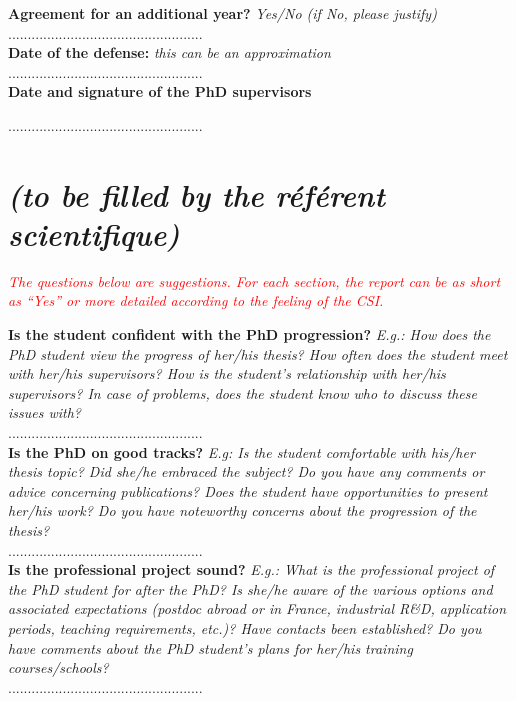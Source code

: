 \documentclass[12pt]{article}
\newcommand{\commentaire}[1]{\small\textit{#1}}
\begin{document}
\noindent\textbf{Agreement for an additional year?}
\commentaire{%
  Yes/No (if No, please justify)\\}
..................................................
\\

\noindent\textbf{Date of the defense:}
\commentaire{%
  this can be an approximation\\}
..................................................
\\


\noindent\textbf{Date and signature of the PhD supervisors}

..................................................

\newpage
\section*{ \textit{\small (to be filled by the ré\-fé\-rent scientifique)}}

\commentaire{%
  \textcolor{red}{The questions below are suggestions. For each
    section, the report can be as short as “Yes” or more detailed
    according to the feeling of the CSI.\\}}

\noindent\textbf{Is the student confident with the PhD progression?}
\commentaire{%
  E.g.: How does the PhD student view the progress of
  her/his thesis? How often does the student meet with her/his
  supervisors? How is the student’s relationship with her/his
  supervisors? In case of problems, does the student know who to
  discuss these issues with?\\}
..................................................
\\

\noindent\textbf{Is the PhD on good tracks?}
\commentaire{%
  E.g: Is the student comfortable with his/her thesis topic? Did
  she/he embraced the subject? Do you have any comments or advice
  concerning publications? Does the student have opportunities to
  present her/his work? Do you have noteworthy concerns about the
  progression of the thesis?\\}
..................................................
\\

\noindent\textbf{Is the professional project sound?}
\commentaire{%
  E.g.: What is the professional project of the PhD student for after
  the PhD? Is she/he aware of the various options and associated
  expectations (postdoc abroad or in France, industrial R\&D,
  application periods, teaching requirements, etc.)? Have contacts
  been established? Do you have comments about the PhD student’s
  plans for her/his training courses/schools?\\}
..................................................
\\
\end{document}
